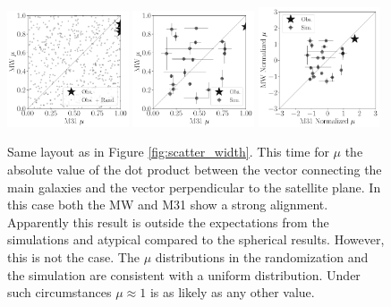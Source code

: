 \documentclass[a4paper,fleqn,usenatbib]{mnras}
\begin{document}
\begin{figure}
\centering
\includegraphics[width=0.32\textwidth]{scatter_random_ranked_mu.pdf}
\includegraphics[width=0.32\textwidth]{scatter_ranked_mu.pdf}
\includegraphics[width=0.32\textwidth]{scatter_norm_mu.pdf}
\caption{Same layout as in Figure \ref{fig:scatter_width}. 
This time for $\mu$ the absolute value of the dot product between the
vector connecting the main galaxies and the vector perpendicular to
the satellite plane.
In this case both the MW and M31 show a strong alignment.
Apparently this result is outside the expectations from the
simulations and atypical compared to the spherical results. 
However, this is not the case. The $\mu$ distributions in the
randomization and the simulation are consistent with a uniform
distribution.
Under such circumstances $\mu\approx 1$ is as likely as
any other value.
\label{fig:scatter_mu}}
\end{figure}
\end{document}
